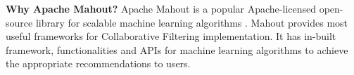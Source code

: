 \begin{enumerate}
\textbf{ Why Apache Mahout?} \newline
    Apache Mahout is a popular Apache-licensed open-source library for scalable machine learning algorithms \cite{mahout_2012}. 
    Mahout provides most useful frameworks for Collaborative Filtering implementation. It has in-built framework, functionalities and APIs for machine learning algorithms to achieve the appropriate recommendations to users.
    
\end{enumerate}
    


